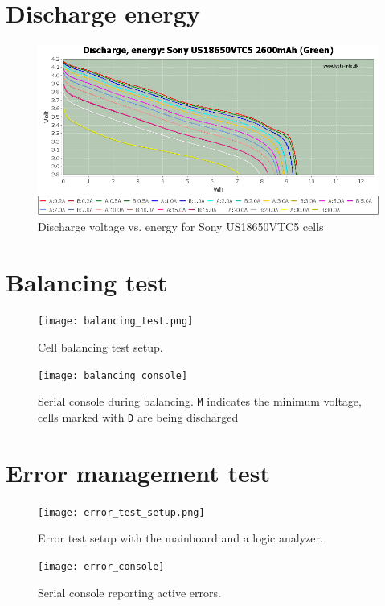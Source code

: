 \chapter{Discharge energy}
\label{chap:vtc5}
\begin{figure}[h]
	\centering
	\includegraphics[scale=0.6]{pictures/vtc5.png}
	\caption{Discharge voltage vs. energy for Sony US18650VTC5 cells \cite{vtc5}}
	\label{fig:vtc5}
\end{figure}

\chapter{Balancing test}
\begin{figure}[h]
	\centering
	\texttt{[image: balancing\_test.png]}
	\caption{Cell balancing test setup.}
	\label{fig:balancing_test}
\end{figure}
\begin{figure}[h]
	\centering
	\texttt{[image: balancing\_console]}
	\caption{Serial console during balancing. \texttt{M} indicates the minimum voltage, cells marked with \texttt{D} are being discharged}
	\label{fig:balancing_console}
\end{figure}

\chapter{Error management test}
\begin{figure}[h]
	\centering
	\texttt{[image: error\_test\_setup.png]}
	\caption{Error test setup with the mainboard and a logic analyzer.}
	\label{fig:error_test_setup}
\end{figure}
\begin{figure}[h]
	\centering
	\texttt{[image: error\_console]}
	\caption{Serial console reporting active errors.}
	\label{fig:error_console}
\end{figure}